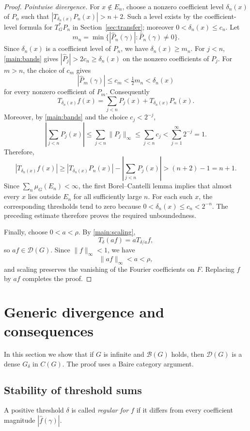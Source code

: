 \documentclass[11pt]{amsart}
\theoremstyle{definition}
\theoremstyle{remark}
\newcommand{\B}{\mathcal B}
\newcommand{\D}{\mathcal D}
\begin{document}
\begin{proof}
\emph{Pointwise divergence.}
For \(x\notin E_n\), choose a nonzero coefficient level
\(\delta_n(x)\) of \(P_n\) such that
\(|T_{\delta_n(x)}P_n(x)|>n+2\).
Such a level exists by the coefficient-level formula for \(T^*_GP_n\)
in Section~\ref{sec:transfer};
moreover \(0<\delta_n(x)\leq c_n\).
Let
\[
 m_n=\min\{|\widehat P_n(\gamma)|:
                   \widehat P_n(\gamma)\ne0\}.
\]
Since \(\delta_n(x)\) is a coefficient level of \(P_n\), we have
\(\delta_n(x)\geq m_n\). For \(j<n\), \eqref{main:bands} gives
\(|\widehat P_j|>2c_n\geq\delta_n(x)\) on the nonzero coefficients
of \(P_j\). For \(m>n\), the choice of \(c_m\) gives
\[
 |\widehat P_m(\gamma)|\leq c_m<\tfrac12m_n<\delta_n(x)
\]
for every nonzero coefficient of \(P_m\). Consequently
\[
 T_{\delta_n(x)}f(x)
   =\sum_{j<n}P_j(x)+T_{\delta_n(x)}P_n(x).
\]
Moreover, by \eqref{main:bands} and the choice \(c_j<2^{-j}\),
\[
 \left|\sum_{j<n}P_j(x)\right|
 \leq\sum_{j<n}\|P_j\|_\infty
 \leq\sum_{j<n}c_j
 <\sum_{j=1}^{\infty}2^{-j}=1.
\]
Therefore,
\[
 \left|T_{\delta_n(x)}f(x)\right|
 \geq \left|T_{\delta_n(x)}P_n(x)\right|
      -\left|\sum_{j<n}P_j(x)\right|
 >(n+2)-1=n+1.
\]
Since \(\sum_n\mu_G(E_n)<\infty\), the first Borel--Cantelli lemma
implies that almost every \(x\) lies outside \(E_n\) for all sufficiently
large \(n\). For each such \(x\), the corresponding thresholds tend to
zero because \(0<\delta_n(x)\leq c_n<2^{-n}\). The preceding estimate
therefore proves the required unboundedness.

Finally, choose \(0<a<\rho\). By \eqref{main:scaling},
\[
 T_\delta(af)=aT_{\delta/a}f,
\]
so \(af\in\D(G)\). Since \(\|f\|_\infty<1\), we have
\[
 \|af\|_\infty<a<\rho,
\]
and scaling preserves the vanishing of the Fourier coefficients on
\(F\). Replacing \(f\) by \(af\) completes the proof.
\end{proof}

\section{Generic divergence and consequences}\label{sec:category}
In this section we show that if \(G\) is infinite and \(\B(G)\) holds,
then \(\D(G)\) is a dense \(G_\delta\) in \(C(G)\). The proof uses a
Baire category argument.
\subsection{Stability of threshold sums}

A positive threshold \(\delta\) is called \emph{regular for \(f\)}
if it differs from every coefficient magnitude \(|\widehat f(\gamma)|\).
\end{document}
